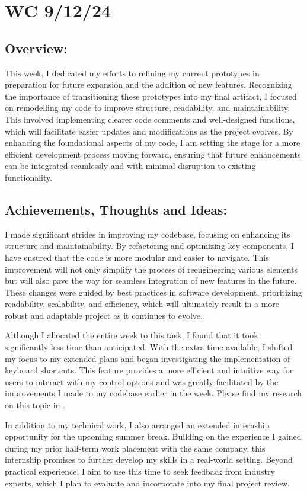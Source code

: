 \section{WC 9/12/24}

\subsection*{Overview:}
This week, I dedicated my efforts to refining my current prototypes in preparation for future expansion and the addition of new features. Recognizing the importance of transitioning these prototypes into my final artifact, I focused on remodelling my code to improve structure, readability, and maintainability. This involved implementing clearer code comments and well-designed functions, which will facilitate easier updates and modifications as the project evolves. By enhancing the foundational aspects of my code, I am setting the stage for a more efficient development process moving forward, ensuring that future enhancements can be integrated seamlessly and with minimal disruption to existing functionality.

\subsection*{Achievements, Thoughts and Ideas:}
I made significant strides in improving my codebase, focusing on enhancing its structure and maintainability. By refactoring and optimizing key components, I have ensured that the code is more modular and easier to navigate. This improvement will not only simplify the process of reengineering various elements but will also pave the way for seamless integration of new features in the future. These changes were guided by best practices in software development, prioritizing readability, scalability, and efficiency, which will ultimately result in a more robust and adaptable project as it continues to evolve.

Although I allocated the entire week to this task, I found that it took significantly less time than anticipated. With the extra time available, I shifted my focus to my extended plans and began investigating the implementation of keyboard shortcuts. This feature provides a more efficient and intuitive way for users to interact with my control options and was greatly facilitated by the improvements I made to my codebase earlier in the week. Please find my research on this topic in .

In addition to my technical work, I also arranged an extended internship opportunity for the upcoming summer break. Building on the experience I gained during my prior half-term work placement with the same company, this internship promises to further develop my skills in a real-world setting. Beyond practical experience, I aim to use this time to seek feedback from industry experts, which I plan to evaluate and incorporate into my final project review. 



